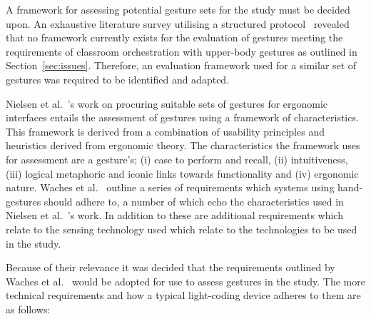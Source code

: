 \documentclass[link]{IWCOMP}
\begin{document}
A framework for assessing potential gesture sets for the study must be decided upon.
An exhaustive literature survey utilising a structured protocol~\citep{kitchenham04} revealed that no framework currently exists for the evaluation of gestures meeting the requirements of classroom orchestration with upper-body gestures as outlined in Section~\ref{sec:issues}.
Therefore, an evaluation framework used for a similar set of gestures was required to be identified and adapted.

Nielsen et al.~\citeyearpar{Nielsen2004}'s work on procuring suitable sets of gestures for ergonomic interfaces entails the assessment of gestures using a framework of characteristics.
This framework is derived from a combination of usability principles and heuristics derived from ergonomic theory.
The characteristics the framework uses for assessment are a gesture's; (i) ease to perform and recall, (ii) intuitiveness, (iii) logical metaphoric and iconic links towards functionality and (iv) ergonomic nature.
Waches et al.~\citeyearpar{Wachs2011} outline a series of requirements which systems using hand-gestures should adhere to, a number of which echo the characteristics used in Nielsen et al.~\citeyearpar{Nielsen2004}'s work.
In addition to these are additional requirements which relate to the sensing technology used which relate to the technologies to be used in the study.

Because of their relevance it was decided that the requirements outlined by Waches et al.~\citeyearpar{Wachs2011} would be adopted for use to assess gestures in the study.
The more technical requirements and how a typical light-coding device adheres to them are as follows:
\end{document}
